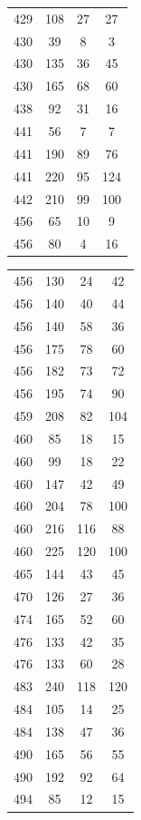 \documentclass[12pt]{amsproc} %
\theoremstyle{definition}\newtheorem{defn}[thm]{Definition}
\theoremstyle{definition}\newtheorem{rem}[thm]{Remark}
\theoremstyle{definition}\newtheorem{ex}[thm]{Example}
\begin{document}
\begin{table}[ht]
\begin{minipage}{0.25\textwidth}
\begin{tabular}{c|c|c|c}
		429 & 108 & 27 & 27 \\ 
		430 & 39 & 8 & 3 \\ 
		430 & 135 & 36 & 45 \\ 
		430 & 165 & 68 & 60 \\ 
		438 & 92 & 31 & 16 \\ 
		441 & 56 & 7 & 7 \\ 
		441 & 190 & 89 & 76 \\
		441 & 220 & 95 & 124 \\
		442 & 210 & 99 & 100 \\
		456 & 65 & 10 & 9 \\
		456 & 80 & 4 & 16 \\
        \end{tabular}
    \end{minipage}
    \hfill
    \begin{minipage}{0.25\textwidth}
        \centering
        \begin{tabular}{c|c|c|c}
		456 & 130 & 24 & 42 \\
		456 & 140 & 40 & 44 \\ 
		456 & 140 & 58 & 36 \\ 
		456 & 175 & 78 & 60 \\ 
		456 & 182 & 73 & 72 \\ 
		456 & 195 & 74 & 90 \\ 
		459 & 208 & 82 & 104 \\ 
		460 & 85 & 18 & 15 \\ 
		460 & 99 & 18 & 22 \\ 
		460 & 147 & 42 & 49 \\ 
		460 & 204 & 78 & 100 \\ 
		460 & 216 & 116 & 88 \\ 
		460 & 225 & 120 & 100 \\ 
		465 & 144 & 43 & 45 \\ 
		470 & 126 & 27 & 36 \\ 
		474 & 165 & 52 & 60 \\ 
		476 & 133 & 42 & 35 \\ 
		476 & 133 & 60 & 28 \\ 
		483 & 240 & 118 & 120 \\ 
		484 & 105 & 14 & 25 \\ 
		484 & 138 & 47 & 36 \\ 
		490 & 165 & 56 & 55 \\ 
		490 & 192 & 92 & 64 \\ 
		494 & 85 & 12 & 15 \\ 

\end{tabular}
\end{minipage}
\end{table}
\end{document}
